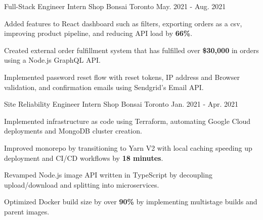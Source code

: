

\begin{cventries}

  \cventry
    {Full-Stack Engineer Intern} %
    {Shop Bonsai} %
    {Toronto} %
    {May. 2021 - Aug. 2021} %
    {
      \begin{cvitems} %
        \item {Added features to React dashboard such as filters, exporting orders as a csv, improving product pipeline, and reducing API load by \textbf{66\%}.}
        \item {Created external order fulfillment system that has fulfilled over \textbf{\$30,000} in orders using a Node.js GraphQL API.}
        \item {Implemented password reset flow with reset tokens, IP address and Browser validation, and confirmation emails using Sendgrid's Email API.}
      \end{cvitems}
    }
    
  \cventry
    {Site Reliability Engineer Intern} %
    {Shop Bonsai} %
    {Toronto} %
    {Jan. 2021 - Apr. 2021} %
    {
      \begin{cvitems} %
        \item {Implemented infrastructure as code using Terraform, automating Google Cloud deployments and MongoDB cluster creation.}
        \item {Improved monorepo by transitioning to Yarn V2 with local caching speeding up deployment and CI/CD workflows by \textbf{18 minutes}.}
        \item {Revamped Node.js image API written in TypeScript by decoupling upload/download and splitting into microservices.}
        \item {Optimized Docker build size by over \textbf{90\%} by implementing multistage builds and parent images.}
      \end{cvitems}
    }
    
\end{cventries}
